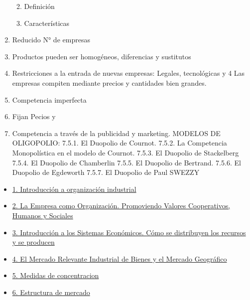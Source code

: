 \documentclass[
  letterpaper,
  DIV=11,
  numbers=noendperiod]{scrartcl}
\providecommand{\tightlist}{%
  \setlength{\itemsep}{0pt}\setlength{\parskip}{0pt}}\usepackage{longtable,booktabs,array}
\begin{document}
\begin{enumerate}
  \begin{enumerate}
  \def\labelenumii{\Alph{enumii})}
  \tightlist
  \item
    Definición
  \item
    Características
  \end{enumerate}
\item
  Reducido N° de empresas
\item
  Productos pueden ser homogéneos, diferencias y sustitutos
\item
  Restricciones a la entrada de nuevas empresas: Legales, tecnológicas y
  4 Las empresas compiten mediante precios y cantidades bien grandes.
\item
  Competencia imperfecta
\item
  Fijan Pecios y
\item
  Competencia a través de la publicidad y marketing. MODELOS DE
  OLIGOPOLIO: 7.5.1. El Duopolio de Cournot. 7.5.2. La Competencia
  Monopolística en el modelo de Cournot. 7.5.3. El Duopolio de
  Stackelberg 7.5.4. El Duopolio de Chamberlin 7.5.5. El Duopolio de
  Bertrand. 7.5.6. El Duopolio de Egdeworth 7.5.7. El Duopolio de Paul
  SWEZZY
\end{enumerate}

\begin{itemize}
\item
  \href{../2023-06-12-introducion-organizacion-industrial/index.qmd}{1.
  Introducción a organización industrial}
\item
  \href{../2023-06-13-empresa-como-organizacion/index.qmd}{2. La Empresa
  como Organización. Promoviendo Valores Cooperativos, Humanos y
  Sociales}
\item
  \href{../2023-06-13-sistemas-economicos/index.qmd}{3. Introducción a
  los Sistemas Económicos. Cómo se distribuyen los recursos y se
  producen}
\item
  \href{../2023-06-15-mercado-relevante-oi-cap-2/index.qmd}{4. El
  Mercado Relevante Industrial de Bienes y el Mercado Geográfico}
\item
  \href{../2023-06-16-concentracion-poder-oi-cap3/index.qmd}{5. Medidas
  de concentracion}
\item
  \href{../2023-06-17-estructura-mercado-oi-cap4/index.qmd}{6.
  Estructura de mercado}
\end{itemize}


\printbibliography
\end{document}
